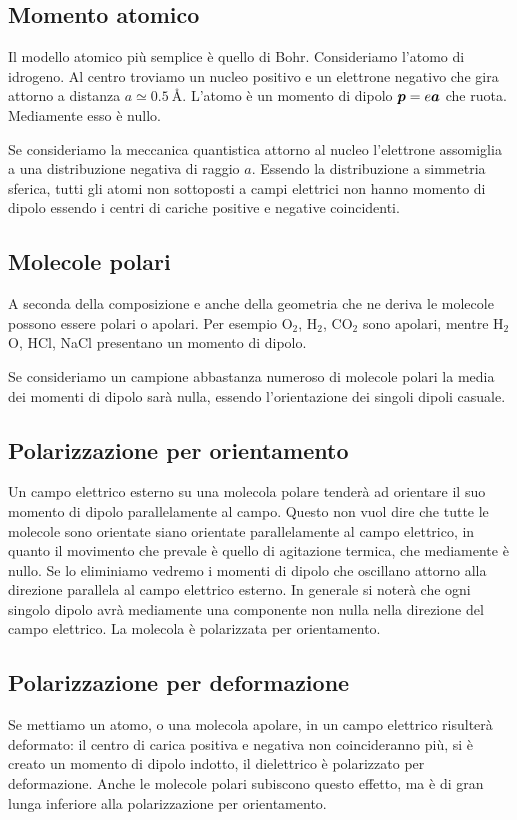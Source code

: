 \subsection{Momento atomico}
Il modello atomico più semplice è quello di Bohr. Consideriamo l'atomo di idrogeno. Al centro troviamo un nucleo positivo e un elettrone negativo che gira attorno a distanza $a\simeq \SI{0.5}{\angstrom}$. L'atomo è un momento di dipolo $\boldsymbol{p}=e\boldsymbol{a}$ che ruota. Mediamente esso è nullo.

Se consideriamo la meccanica quantistica attorno al nucleo l'elettrone assomiglia a una distribuzione negativa di raggio $a$. Essendo la distribuzione a simmetria sferica, tutti gli atomi non sottoposti a campi elettrici non hanno momento di dipolo essendo i centri di cariche positive e negative coincidenti.
\subsection{Molecole polari}
A seconda della composizione e anche della geometria che ne deriva le molecole possono essere polari o apolari. Per esempio O$_2$, H$_2$, CO$_2$ sono apolari, mentre H$_2$O, HCl, NaCl presentano un momento di dipolo.

Se consideriamo un campione abbastanza numeroso di molecole polari la media dei momenti di dipolo sarà nulla, essendo l'orientazione dei singoli dipoli casuale.
\subsection{Polarizzazione per orientamento}
Un campo elettrico esterno su una molecola polare tenderà ad orientare il suo momento di dipolo parallelamente al campo. Questo non vuol dire che tutte le molecole sono orientate siano orientate parallelamente al campo elettrico, in quanto il movimento che prevale è quello di agitazione termica, che mediamente è nullo. Se lo eliminiamo vedremo i momenti di dipolo che oscillano attorno alla direzione parallela al campo elettrico esterno. In generale si noterà che ogni singolo dipolo avrà mediamente una componente non nulla nella direzione del campo elettrico. La molecola è polarizzata per orientamento.
\subsection{Polarizzazione per deformazione}
Se mettiamo un atomo, o una molecola apolare, in un campo elettrico risulterà deformato: il centro di carica positiva e negativa non coincideranno più, si è creato un momento di dipolo indotto, il dielettrico è polarizzato per deformazione. Anche le molecole polari subiscono questo effetto, ma è di gran lunga inferiore alla polarizzazione per orientamento.
